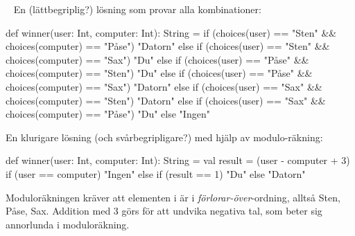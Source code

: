 %
%
%
%
%
%
%



\SOLUTION

\TaskSolved \what~ En (lättbegriplig?) lösning som provar alla kombinationer:

\begin{CodeSmall}
  def winner(user: Int, computer: Int): String =
    if      (choices(user) == "Sten" && choices(computer) == "Påse") "Datorn"
    else if (choices(user) == "Sten" && choices(computer) == "Sax")  "Du"
    else if (choices(user) == "Påse" && choices(computer) == "Sten") "Du"
    else if (choices(user) == "Påse" && choices(computer) == "Sax")  "Datorn"
    else if (choices(user) == "Sax"  && choices(computer) == "Sten") "Datorn"
    else if (choices(user) == "Sax"  && choices(computer) == "Påse") "Du"
    else "Ingen"
\end{CodeSmall}


En klurigare lösning (och svårbegripligare?) med hjälp av modulo-räkning:

\begin{Code}
  def winner(user: Int, computer: Int): String = {
     val result = (user - computer + 3) %
     if (user == computer) "Ingen"
     else if (result == 1) "Du"
     else "Datorn"
  }
\end{Code}
Moduloräkningen kräver att elementen i  är i \emph{förlorar-över}-ordning, alltså Sten, Påse, Sax. Addition med 3 görs för att undvika negativa tal, som beter sig annorlunda i moduloräkning.

\QUESTEND





